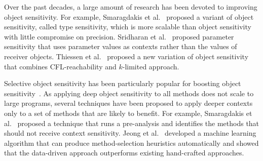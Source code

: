 Over the past decades, a large amount of  research
 has been devoted to improving object sensitivity.
For example, Smaragdakis et al.~\cite{Smaragdakis2011} proposed a variant of object sensitivity, called type sensitivity, which is more scalable than object sensitivity with little compromise on precision.
Sridharan et al.~\cite{SridharanDCST12} proposed parameter sensitivity that uses parameter values as contexts rather than the values of receiver objects.
Thiessen et al.~\cite{Thiessen2017} proposed a new variation of object sensitivity
that combines CFL-reachability and $k$-limited approach. 


Selective object sensitivity has been particularly popular for boosting object 
sensitivity~\cite{Smaragdakis2014,Li2018a,Li2018b,JeJeChOh17,WeiR15,Liang2011,Liang2011learning,Lu:2019:PYF}.  As 
applying deep object sensitivity to
all methods does not scale to large programs, several techniques have
been proposed to apply deeper contexts only to a set of methods
that are likely to benefit.
For example, Smaragdakis et al.~\cite{Smaragdakis2014} proposed a technique that runs a
pre-analysis and identifies the methods that should not receive
context sensitivity. Jeong et al.~\cite{JeJeChOh17} developed a machine learning
algorithm that can produce method-selection heuristics automatically
and showed that the data-driven approach outperforms existing
hand-crafted approaches. 






